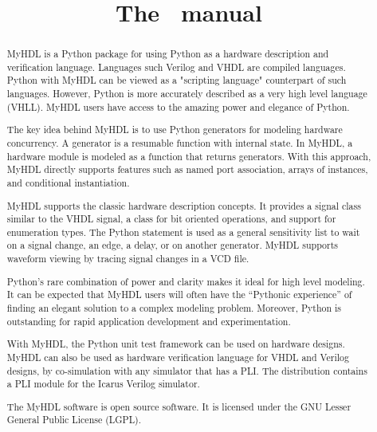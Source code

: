 \documentclass{manual}
\title{The \myhdl\ manual}
\newcommand{\myhdl}{\protect \mbox{MyHDL}}
\begin{document}
\maketitle



\begin{abstract}

\noindent

\myhdl{} is a Python package for using Python as a hardware description
and verification language. Languages such Verilog and VHDL are
compiled languages. Python with \myhdl{} can be viewed as a "scripting
language" counterpart of such languages. However, Python is more
accurately described as a very high level language (VHLL). \myhdl{} users
have access to the amazing power and elegance of Python.


The key idea behind \myhdl{} is to use Python generators for modeling
hardware concurrency. A generator is a resumable function with
internal state. In \myhdl{}, a hardware module is modeled as a function
that returns generators. With this approach, \myhdl{} directly supports
features such as named port association, arrays of instances, and
conditional instantiation. 


\myhdl{} supports the classic hardware description concepts.  It provides
a signal class similar to the VHDL signal, a class for bit oriented
operations, and support for enumeration types.  The Python
 statement is used as a general sensitivity list to
wait on a signal change, an edge, a delay, or on another
generator. \myhdl{} supports waveform viewing by tracing signal changes
in a VCD file.

Python's rare combination of power and clarity makes it ideal for high
level modeling.  It can be expected that \myhdl{} users will often
have the ``Pythonic experience'' of finding an elegant solution to a
complex modeling problem. Moreover, Python is outstanding for rapid
application development and experimentation.

With \myhdl{}, the Python unit test framework can be used on hardware
designs.  \myhdl{} can also be used as hardware verification language for
VHDL and Verilog designs, by co-simulation with any simulator that has
a PLI.  The distribution contains a PLI module for the
Icarus Verilog simulator.


The \myhdl{} software is open source software. It is licensed under the
GNU Lesser General Public License (LGPL).




\end{abstract}

\tableofcontents









\end{document}
